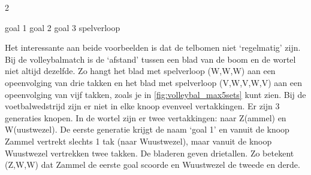 \begin{multicols}{2}
\begin{afbeeldingenv}
\hspace{1.1cm}goal 1 \hspace{0.1cm}goal 2 \hspace{0.1cm}goal 3  \hspace{0.2cm}spelverloop
\\
\caption{Voetbalmatch met uitslag 1-2 voor Wuustwezel}
\label{fig:voetbal}
\end{afbeeldingenv}

Het interessante aan beide voorbeelden is dat de telbomen niet ‘regelmatig’ zijn. Bij de volleybalmatch is de ‘afstand’ tussen een blad van de boom en de wortel niet altijd dezelfde. Zo hangt het blad met spelverloop (W,W,W) aan een opeenvolging van drie takken en het blad met spelverloop (V,W,V,W,V) aan een opeenvolging van vijf takken, zoals je in \autoref{fig:volleybal_max5sets} kunt zien. Bij de voetbalwedstrijd zijn er niet in elke knoop evenveel vertakkingen. Er zijn 3 generaties knopen. In de wortel zijn er twee vertakkingen: naar Z(ammel) en W(uustwezel). De eerste generatie krijgt de naam ‘goal 1’ en vanuit de knoop Zammel vertrekt slechts 1 tak (naar Wuustwezel), maar vanuit de knoop Wuustwezel vertrekken twee takken. De bladeren geven drietallen. Zo betekent (Z,W,W) dat Zammel de eerste goal scoorde en Wuustwezel de tweede en derde. 


\end{multicols}
